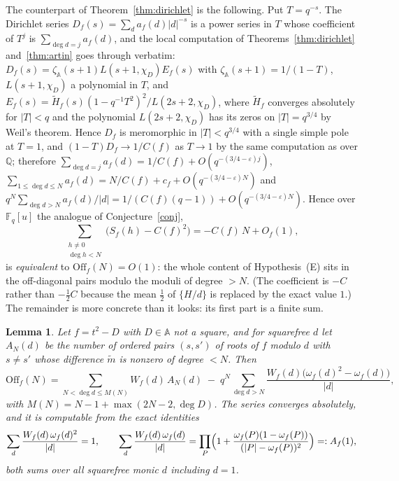 \documentclass[11pt,a4paper]{article}
\newtheorem{lemma}[theorem]{Lemma}
\theoremstyle{remark}\newtheorem{remark}[theorem]{Remark}
\newcommand{\F}{\mathbb{F}}
\newcommand{\A}{\mathbb{A}}
\newcommand{\Q}{\mathbb{Q}}
\begin{document}
The counterpart of Theorem~\ref{thm:dirichlet} is the following. Put $T=q^{-s}$. The Dirichlet series
$D_f(s)=\sum_da_f(d)|d|^{-s}$ is a power series in $T$ whose coefficient of $T^j$ is $\sum_{\deg d=j}a_f(d)$,
and the local computation of Theorems~\ref{thm:dirichlet} and~\ref{thm:artin} goes through verbatim:
$D_f(s)=\zeta_\A(s+1)L(s+1,\chi_D)E_f(s)$ with $\zeta_\A(s+1)=1/(1-T)$, $L(s+1,\chi_D)$ a polynomial in
$T$, and $E_f(s)=\tilde H_f(s)(1-q^{-1}T^2)^2/L(2s+2,\chi_D)$, where $\tilde H_f$ converges absolutely for
$|T|<q$ and the polynomial $L(2s+2,\chi_D)$ has its zeros on $|T|=q^{3/4}$ by Weil's theorem. Hence
$D_f$ is meromorphic in $|T|<q^{3/4}$ with a single simple pole at $T=1$, and $(1-T)D_f\to1/C(f)$ as
$T\to1$ by the same computation as over $\Q$; therefore
$\sum_{\deg d=j}a_f(d)=1/C(f)+O(q^{-(3/4-\varepsilon)j})$,
$\sum_{1\le\deg d\le N}a_f(d)=N/C(f)+c_f+O(q^{-(3/4-\varepsilon)N})$ and
$q^N\sum_{\deg d>N}a_f(d)/|d|=1/(C(f)(q-1))+O(q^{-(3/4-\varepsilon)N})$. Hence over $\F_q[u]$ the
analogue of Conjecture~\ref{conj},
\begin{equation}\label{eq:ffconj}
\sum_{\substack{h\ne0\\\deg h<N}}\bigl(S_f(h)-C(f)^2\bigr)=-C(f)\,N+O_f(1),
\end{equation}
is \emph{equivalent} to $\mathrm{Off}_f(N)=O(1)$: the whole content of Hypothesis~(E) sits in the
off-diagonal pairs modulo the moduli of degree $>N$. (The coefficient is $-C$ rather than $-\tfrac12C$
because the mean $\tfrac12$ of $\{H/d\}$ is replaced by the exact value $1$.) The remainder is more
concrete than it looks: its first part is a finite sum.

\begin{lemma}\label{lem:support}
Let $f=t^2-D$ with $D\in\A$ not a square, and for squarefree $d$ let $A_N(d)$ be the number of ordered
pairs $(s,s')$ of roots of $f$ modulo $d$ with $s\ne s'$ whose difference $\tilde m$ is nonzero of degree
$<N$. Then
\[
\mathrm{Off}_f(N)=\sum_{N<\deg d\le M(N)}W_f(d)\,A_N(d)\;-\;q^N\sum_{\deg d>N}\frac{W_f(d)\bigl(\omega_f(d)^2-\omega_f(d)\bigr)}{|d|},
\]
with $M(N)=N-1+\max(2N-2,\deg D)$.
The series converges absolutely, and it is computable from the exact identities
\[
\sum_{d}\frac{W_f(d)\,\omega_f(d)^2}{|d|}=1,\qquad
\sum_{d}\frac{W_f(d)\,\omega_f(d)}{|d|}=\prod_P\Bigl(1+\frac{\omega_f(P)(1-\omega_f(P))}{(|P|-\omega_f(P))^2}\Bigr)=:A_f(1),
\]
both sums over all squarefree monic $d$ including $d=1$.
\end{lemma}
\end{document}
